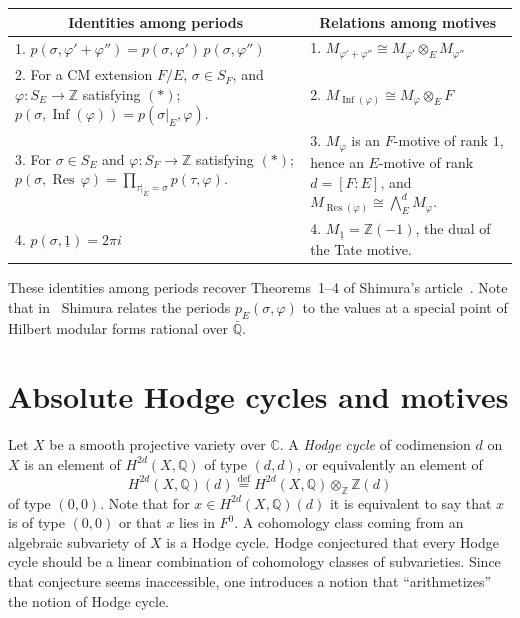 \documentclass[11pt]{amsart}
\theoremstyle{definition}
\DeclareMathOperator{\Res}{Res}
\DeclareMathOperator{\Inf}{Inf}
\newcommand{\ZZ}{\mathbb{Z}}
\newcommand{\QQ}{\mathbb{Q}}
\newcommand{\CC}{\mathbb{C}}
\begin{document}
\begin{center}
\renewcommand{\arraystretch}{1.15}
\begin{tabular}{p{}|p{}}
\multicolumn{1}{c}{\textbf{Identities among periods}} & \multicolumn{1}{c}{\textbf{Relations among motives}} \\\midrule
1. $p(\sigma,\varphi'+\varphi'')=p(\sigma,\varphi')\,p(\sigma,\varphi'')$ & 1. $M_{\varphi'+\varphi''}\cong M_{\varphi'}\otimes_E M_{\varphi''}$ \\[6pt]
\shortstack[l]{2. For a CM extension $F/E$, $\sigma\in S_F$, \\ and $\varphi:S_E\to\ZZ$ satisfying $(*)$; \\ $p(\sigma,\Inf(\varphi)) = p(\sigma|_E,\varphi)$.} & 2. $M_{\Inf(\varphi)}\cong M_\varphi\otimes_E F$ \\[6pt]
\shortstack[l]{3. For $\sigma\in S_E$ and $\varphi:S_F\to\ZZ$ satisfying $(*)$; \\ $p(\sigma,\Res\,\varphi)=\prod_{\tau|_E=\sigma} p(\tau,\varphi)$.} & \shortstack[l]{3. $M_\varphi$ is an $F$-motive of rank $1$, hence an $E$-motive \\ of rank $d=[F:E]$, and \\ $M_{\Res(\varphi)}\cong \bigwedge_E^d M_\varphi$.} \\[6pt]
4. $p(\sigma,\underline{1}) = 2\pi i$ & 4. $M_{\underline{1}} = \ZZ(-1)$, the dual of the Tate motive. \\
\end{tabular}
\end{center}

These identities among periods recover Theorems~1--4 of Shimura's article~\cite{Shimura2}. Note that in~\cite{Shimura2} Shimura relates the periods $p_E(\sigma,\varphi)$ to the values at a special point of Hilbert modular forms rational over $\bar{\QQ}$.

\section{Absolute Hodge cycles and motives}

Let $X$ be a smooth projective variety over $\CC$. A \emph{Hodge cycle} of codimension $d$ on $X$ is an element of $H^{2d}(X,\QQ)$ of type $(d,d)$, or equivalently an element of
\[
H^{2d}(X,\QQ)(d) \overset{\text{def}}{=} H^{2d}(X,\QQ)\otimes_\ZZ \ZZ(d)
\]
of type $(0,0)$. Note that for $x\in H^{2d}(X,\QQ)(d)$ it is equivalent to say that $x$ is of type $(0,0)$ or that $x$ lies in $F^0$. A cohomology class coming from an algebraic subvariety of $X$ is a Hodge cycle. Hodge conjectured that every Hodge cycle should be a linear combination of cohomology classes of subvarieties. Since that conjecture seems inaccessible, one introduces a notion that ``arithmetizes'' the notion of Hodge cycle.
\end{document}

